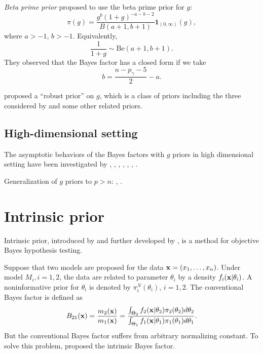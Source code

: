 \documentclass[11pt]{article}
\theoremstyle{plain}
\theoremstyle{definition}
\theoremstyle{remark}
\begin{document}
\emph{Beta prime prior}
\cite{maruyama2011} proposed to use the beta prime prior for $g$:
\begin{equation*}
    \pi(g)=\frac{g^b (1+g)^{-a-b-2}}{B(a+1,b+1)}\mathbf{1}_{(0,\infty)}(g),
\end{equation*}
where $a>-1$, $b>-1$.
Equivalently,
\begin{equation*}
    \frac{1}{1+g}\sim \text{Be} (a+1,b+1).
\end{equation*}
They observed that the Bayes factor has a closed form if we take
\begin{equation*}
    b=\frac{n-p_\gamma-5}{2}-a.
\end{equation*}


\cite{bayarri2012} proposed a ``robust prior'' on $g$, which is a class of priors including the three considered by \cite{Liang2008Mixtures} and some other related priors.


\subsection{High-dimensional setting}
The asymptotic behaviors of the Bayes factors with $g$ priors in high dimensional setting have been investigated by \cite{Mukhopadhyay2014}, \cite{wang2017posterior}, \cite{Wang2016}, \cite{WANG201495}, \cite{wang2017}, \cite{XIANG201664},
\cite{Mukhopadhyay2016}.

Generalization of $g$ priors to $p>n$: \cite{maruyama2011}, \cite{Shang2011}.


\section{Intrinsic prior}
Intrinsic prior, introduced by \cite{intrisicBayesFactor} and further developed by \cite{Moreno1998An}, is a method for objective Bayes hypothesis testing.

Suppose that two models are proposed for the data $\mathbf{x}=(x_1,\ldots, x_n)$.
Under model $M_i, i=1,2$, the data are related to parameter $\theta_i$ by a density $f_i(\mathbf{x} | \theta_i)$.
A noninformative prior for $\theta_i$ is denoted by $\pi_i^N(\theta_i)$, $i=1,2$.
The conventional Bayes factor is defined as
\begin{equation*}
    B_{21}(\mathbf{x}) = \frac{m_2(\mathbf{x})}{m_1(\mathbf{x})}= \frac{\int_{\Theta_2} f_2(\mathbf{x} |\theta_2) \pi_2( \theta_2 ) d \theta_2}{\int_{\Theta_1} f_1(\mathbf{x} | \theta_1) \pi_1 (\theta_1) d \theta_1}.
\end{equation*}
But the conventional Bayes factor suffers from arbitrary normalizing constant.
To solve this problem, \cite{intrisicBayesFactor} proposed the intrinsic Bayes factor.
\end{document}
